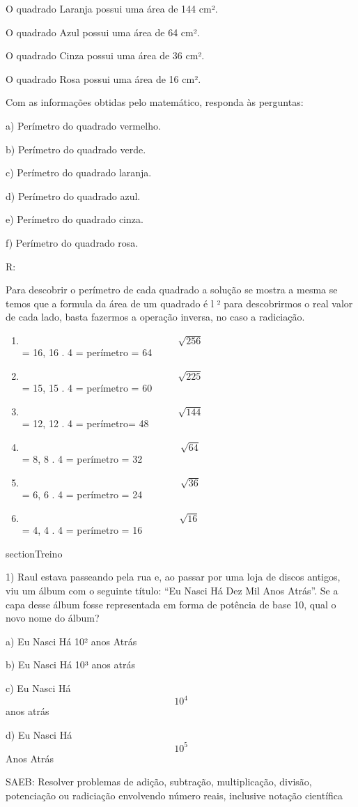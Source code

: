 O quadrado Laranja possui uma área de 144 cm².

O quadrado Azul possui uma área de 64 cm².

O quadrado Cinza possui uma área de 36 cm².

O quadrado Rosa possui uma área de 16 cm².

Com as informações obtidas pelo matemático, responda às perguntas:

a) Perímetro do quadrado vermelho.

b) Perímetro do quadrado verde.

c) Perímetro do quadrado laranja.

d) Perímetro do quadrado azul.

e) Perímetro do quadrado cinza.

f) Perímetro do quadrado rosa.

R:

Para descobrir o perímetro de cada quadrado a solução se mostra a mesma
se temos que a formula da área de um quadrado é l ² para descobrirmos o
real valor de cada lado, basta fazermos a operação inversa, no caso a
radiciação.

\begin{enumerate}
\def\labelenumi{\alph{enumi})}
\item
  \[\ \sqrt{256}\] = 16, 16 . 4 = perímetro = 64
\item
  \[\ \sqrt{225}\] = 15, 15 . 4 = perímetro = 60
\item
  \[\ \sqrt{144}\] = 12, 12 . 4 = perímetro= 48
\item
  \[\ \sqrt{64}\] = 8, 8 . 4 = perímetro = 32
\item
  \[\ \sqrt{36}\] = 6, 6 . 4 = perímetro = 24
\item
  \[\sqrt{16}\] = 4, 4 . 4 = perímetro = 16
\end{enumerate}

section{Treino}

1) Raul estava passeando pela rua e, ao passar por uma loja de discos
antigos, viu um álbum com o seguinte título: ``Eu Nasci Há Dez Mil Anos
Atrás''. Se a capa desse álbum fosse representada em forma de potência
de base 10, qual o novo nome do álbum?

a) Eu Nasci Há 10² anos Atrás

b) Eu Nasci Há 10³ anos atrás

c) Eu Nasci Há \[10^4\] anos atrás

d) Eu Nasci Há \[10^5\] Anos Atrás

SAEB: Resolver problemas de adição, subtração, multiplicação, divisão,
potenciação ou radiciação envolvendo número reais, inclusive notação
científica

